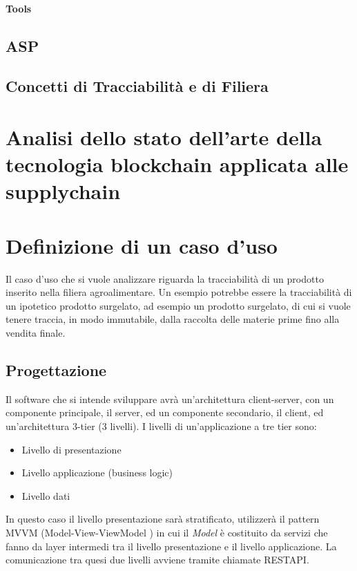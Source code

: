 \documentclass[a4paper,11pt]{article}
\begin{document}

\paragraph{Tools}
\subsection{ASP}

\subsection{Concetti di Tracciabilità e di Filiera}
\section{Analisi dello stato dell’arte della tecnologia blockchain applicata alle supplychain}
\section{Definizione di un caso d’uso}
Il caso d'uso che si vuole analizzare riguarda la tracciabilità di un prodotto inserito nella filiera agroalimentare. Un esempio potrebbe essere la tracciabilità di un ipotetico prodotto surgelato, ad esempio un prodotto surgelato, di cui si vuole tenere traccia, in modo immutabile, dalla raccolta delle materie prime fino alla vendita finale.


\subsection{Progettazione}

Il software che si intende sviluppare avrà un'architettura client-server, con un componente principale, il server, ed un componente secondario, il client, ed un'architettura 3-tier (3 livelli). I livelli di un'applicazione a tre tier sono:
\begin{itemize}
  \item Livello di presentazione
  \item Livello applicazione (business logic)
  \item Livello dati
\end{itemize}

In questo caso il livello presentazione sarà stratificato, utilizzerà il pattern MVVM (Model-View-ViewModel \cite{wikipediaModelviewviewmodelWikipedia}) in cui il \textit{Model} è costituito da servizi che fanno da layer intermedi tra il livello presentazione e il livello applicazione. La comunicazione tra quesi due livelli avviene tramite chiamate RESTAPI.
\end{document}
